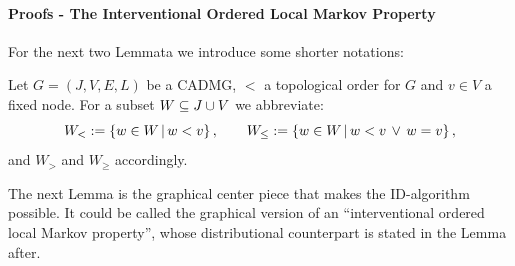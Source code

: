 \paragraph{Proofs - The Interventional Ordered Local Markov Property}\hfill

For the next two Lemmata we introduce some shorter notations:

\begin{Not}
    Let $G=(J,V,E,L)$ be a CADMG, $<$ a topological order for $G$ and $v \in V$ a fixed node.
    For a subset $W \subseteq J \cup V$ we abbreviate:
    \[ W_<:=\left \{ w \in W \,\middle|\, w < v \right \}, \qquad W_\le:=\left \{ w \in W \,\middle|\, w < v \,\lor\, w=v \right \}, \]
    and $W_>$ and $W_\ge$ accordingly.
\end{Not}

The next Lemma is the graphical center piece that makes the ID-algorithm possible.
It could be called the graphical version of an ``interventional ordered local Markov property'',
whose distributional counterpart is stated in the Lemma after.


